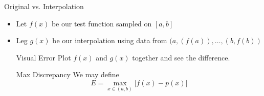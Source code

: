 \documentclass[10pt]{beamer}
\begin{document}
\begin{frame}{Original vs. Interpolation}

    \begin{itemize}
        \item Let $f(x)$ be our test function sampled on $[a,b]$ 

        \item Leg $g(x)$ be our interpolation using data from $(a,(f(a)),\dots,(b,f(b))$

        \begin{block}{Visual Error}
            Plot $f(x)$ and $g(x)$ together and see the difference.
        \end{block}

        \begin{block}{Max Discrepancy}
            We may define 
            $$
                E = \max_{x\in(a,b)} |f(x)-p(x)|
            $$
        \end{block}
    \end{itemize}

\end{frame}
\end{document}
